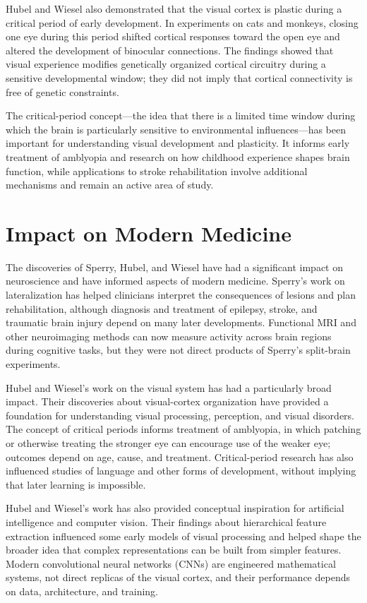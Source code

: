 Hubel and Wiesel also demonstrated that the visual cortex is plastic during a critical period of early development. In experiments on cats and monkeys, closing one eye during this period shifted cortical responses toward the open eye and altered the development of binocular connections. The findings showed that visual experience modifies genetically organized cortical circuitry during a sensitive developmental window; they did not imply that cortical connectivity is free of genetic constraints.

The critical-period concept---the idea that there is a limited time window during which the brain is particularly sensitive to environmental influences---has been important for understanding visual development and plasticity. It informs early treatment of amblyopia and research on how childhood experience shapes brain function, while applications to stroke rehabilitation involve additional mechanisms and remain an active area of study.

\section{Impact on Modern Medicine}

The discoveries of Sperry, Hubel, and Wiesel have had a significant impact on neuroscience and have informed aspects of modern medicine. Sperry's work on lateralization has helped clinicians interpret the consequences of lesions and plan rehabilitation, although diagnosis and treatment of epilepsy, stroke, and traumatic brain injury depend on many later developments. Functional MRI and other neuroimaging methods can now measure activity across brain regions during cognitive tasks, but they were not direct products of Sperry's split-brain experiments.

Hubel and Wiesel's work on the visual system has had a particularly broad impact. Their discoveries about visual-cortex organization have provided a foundation for understanding visual processing, perception, and visual disorders. The concept of critical periods informs treatment of amblyopia, in which patching or otherwise treating the stronger eye can encourage use of the weaker eye; outcomes depend on age, cause, and treatment. Critical-period research has also influenced studies of language and other forms of development, without implying that later learning is impossible.

Hubel and Wiesel's work has also provided conceptual inspiration for artificial intelligence and computer vision. Their findings about hierarchical feature extraction influenced some early models of visual processing and helped shape the broader idea that complex representations can be built from simpler features. Modern convolutional neural networks (CNNs) are engineered mathematical systems, not direct replicas of the visual cortex, and their performance depends on data, architecture, and training.

